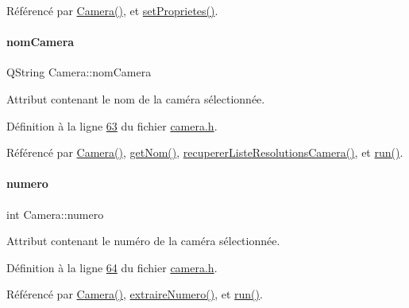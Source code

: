 Référencé par \hyperlink{camera_8cpp_source_l00012}{Camera()}, et \hyperlink{camera_8cpp_source_l00108}{set\+Proprietes()}.

\mbox{\label{class_camera_ac1cdaf82921d2a2f3f941d867718eba2}} 
\paragraph{\texorpdfstring{nom\+Camera}{nomCamera}}
{\footnotesize\ttfamily Q\+String Camera\+::nom\+Camera\hspace{0.3cm}{\ttfamily [private]}}



Attribut contenant le nom de la caméra sélectionnée. 



Définition à la ligne \hyperlink{camera_8h_source_l00063}{63} du fichier \hyperlink{camera_8h_source}{camera.\+h}.



Référencé par \hyperlink{camera_8cpp_source_l00012}{Camera()}, \hyperlink{camera_8cpp_source_l00103}{get\+Nom()}, \hyperlink{camera_8cpp_source_l00133}{recuperer\+Liste\+Resolutions\+Camera()}, et \hyperlink{camera_8cpp_source_l00068}{run()}.

\mbox{\label{class_camera_ae5cda5df3c9c49b88fff15389a1bbc64}} 
\paragraph{\texorpdfstring{numero}{numero}}
{\footnotesize\ttfamily int Camera\+::numero\hspace{0.3cm}{\ttfamily [private]}}



Attribut contenant le numéro de la caméra sélectionnée. 



Définition à la ligne \hyperlink{camera_8h_source_l00064}{64} du fichier \hyperlink{camera_8h_source}{camera.\+h}.



Référencé par \hyperlink{camera_8cpp_source_l00034}{Camera()}, \hyperlink{camera_8cpp_source_l00276}{extraire\+Numero()}, et \hyperlink{camera_8cpp_source_l00068}{run()}.

\mbox{\label{class_camera_ad1dde4d981877001281af01c392307f1}} 
